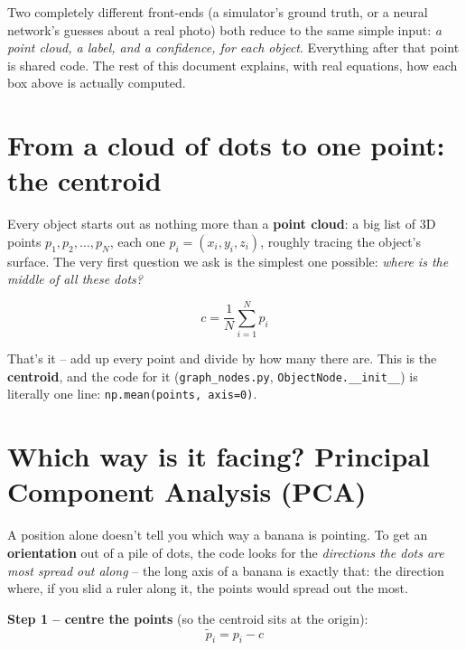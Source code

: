 \documentclass[11pt]{article}
\begin{document}
Two completely different front-ends (a simulator's ground truth, or a neural
network's guesses about a real photo) both reduce to the same simple input:
\emph{a point cloud, a label, and a confidence, for each object}. Everything
after that point is shared code. The rest of this document explains, with
real equations, how each box above is actually computed.

\section{From a cloud of dots to one point: the centroid}

Every object starts out as nothing more than a \textbf{point cloud}: a big
list of 3D points $p_1, p_2, \dots, p_N$, each one $p_i = (x_i, y_i, z_i)$,
roughly tracing the object's surface. The very first question we ask is the
simplest one possible: \emph{where is the middle of all these dots?}

\[
c = \frac{1}{N}\sum_{i=1}^{N} p_i
\]

That's it -- add up every point and divide by how many there are. This is
the \textbf{centroid}, and the code for it
(\texttt{graph\_nodes.py}, \texttt{ObjectNode.\_\_init\_\_}) is literally one
line: \texttt{np.mean(points, axis=0)}.

\begin{center}
\end{center}

\section{Which way is it facing? Principal Component Analysis (PCA)}

A position alone doesn't tell you which way a banana is pointing. To get an
\textbf{orientation} out of a pile of dots, the code looks for the
\emph{directions the dots are most spread out along} -- the long axis of a
banana is exactly that: the direction where, if you slid a ruler along it,
the points would spread out the most.

\textbf{Step 1 -- centre the points} (so the centroid sits at the origin):
\[
\tilde p_i = p_i - c
\]
\end{document}

